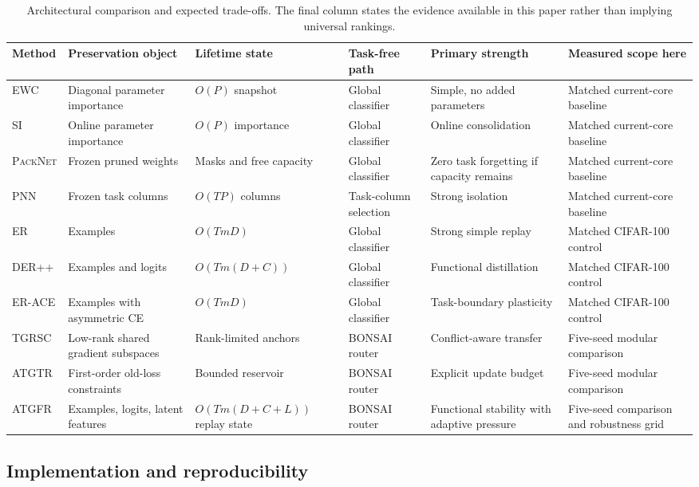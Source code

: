 \documentclass[conference]{IEEEtran}
\newcommand{\ATGFR}{\textsc{ATGFR}}
\newcommand{\TGRSC}{\textsc{TGRSC}}
\newcommand{\ATGTR}{\textsc{ATGTR}}
\newcommand{\BONSAI}{\textsc{BONSAI}}
\newcommand{\EWC}{\textsc{EWC}}
\newcommand{\SI}{\textsc{SI}}
\newcommand{\PNN}{\textsc{PNN}}
\newcommand{\PackNet}{\textsc{PackNet}}
\begin{document}
\begin{table}[t]
\centering
\caption{Architectural comparison and expected trade-offs. The final column
states the evidence available in this paper rather than implying universal
rankings.}
\label{tab:architectures}
\small
\begin{tabular}{p{1.35cm}p{2.0cm}p{2.15cm}p{2.0cm}p{2.35cm}p{3.0cm}}
\hline
\textbf{Method} & \textbf{Preservation object} & \textbf{Lifetime state} &
\textbf{Task-free path} & \textbf{Primary strength} & \textbf{Measured scope here}\\
\hline
\EWC{} & Diagonal parameter importance & \(O(P)\) snapshot & Global classifier &
Simple, no added parameters & Matched current-core baseline\\
\SI{} & Online parameter importance & \(O(P)\) importance & Global classifier &
Online consolidation & Matched current-core baseline\\
\PackNet{} & Frozen pruned weights & Masks and free capacity &
Global classifier & Zero task forgetting if capacity remains & Matched current-core baseline\\
\PNN{} & Frozen task columns & \(O(TP)\) columns & Task-column selection &
Strong isolation & Matched current-core baseline\\
ER & Examples & \(O(TmD)\) & Global classifier & Strong simple replay &
Matched CIFAR-100 control\\
DER++ & Examples and logits & \(O(Tm(D+C))\) & Global classifier &
Functional distillation & Matched CIFAR-100 control\\
ER-ACE & Examples with asymmetric CE & \(O(TmD)\) & Global classifier &
Task-boundary plasticity & Matched CIFAR-100 control\\
\TGRSC{} & Low-rank shared gradient subspaces & Rank-limited anchors &
\BONSAI{} router & Conflict-aware transfer & Five-seed modular comparison\\
\ATGTR{} & First-order old-loss constraints & Bounded reservoir &
\BONSAI{} router & Explicit update budget & Five-seed modular comparison\\
\ATGFR{} & Examples, logits, latent features & \(O(Tm(D+C+L))\) replay state &
\BONSAI{} router & Functional stability with adaptive pressure & Five-seed comparison and robustness grid\\
\hline
\end{tabular}
\end{table}

\subsection{Implementation and reproducibility}
\end{document}
